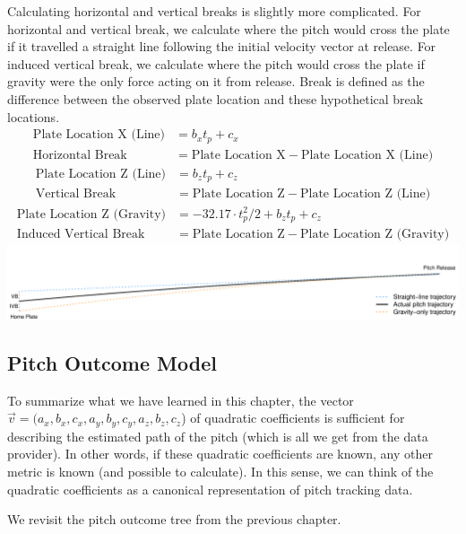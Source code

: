 \documentclass{article}
\begin{document}
    Calculating horizontal and vertical breaks is slightly more complicated. For horizontal and vertical break, we calculate where the pitch would cross the plate if it travelled a straight line following the initial velocity vector at release. For induced vertical break, we calculate where the pitch would cross the plate if gravity were the only force acting on it from release. Break is defined as the difference between the observed plate location and these hypothetical break locations.
    \begin{align*}
      \mbox{Plate Location X (Line)} &= b_x t_p + c_x\\
      \mbox{Horizontal Break} &= \mbox{Plate Location X} - \mbox{Plate Location X (Line)}
    \end{align*}
    \begin{align*}
      \mbox{Plate Location Z (Line)} &= b_z t_p + c_z\\
      \mbox{Vertical Break} &= \mbox{Plate Location Z} - \mbox{Plate Location Z (Line)}
    \end{align*}
    \begin{align*}
      \mbox{Plate Location Z (Gravity)} &= -32.17 \cdot t_p^2 / 2 + b_z t_p + c_z\\
      \mbox{Induced Vertical Break} &= \mbox{Plate Location Z} - \mbox{Plate Location Z (Gravity)}
    \end{align*}
    \includegraphics[width = \textwidth]{figures/vertical_break_illustration.pdf}

  
  \subsection{\sc Pitch Outcome Model}

    To summarize what we have learned in this chapter, the vector $\vec v = (a_x, b_x, c_x, a_y, b_y, c_y, a_z, b_z, c_z$) of quadratic coefficients is sufficient for describing the estimated path of the pitch (which is all we get from the data provider). In other words, if these quadratic coefficients are known, any other metric is known (and possible to calculate). In this sense, we can think of the quadratic coefficients as a canonical representation of pitch tracking data.
    
    We revisit the pitch outcome tree from the previous chapter.
\end{document}
